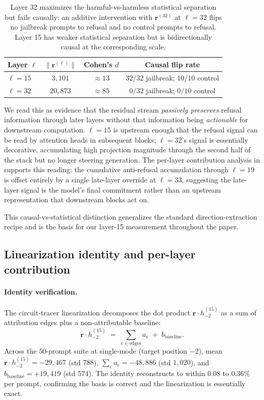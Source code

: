 \documentclass{article}
\newcommand{\rvec}{\bm{r}}
\newcommand{\norm}[1]{\lVert #1 \rVert}
\begin{document}
\begin{table}[h]
\centering
\small
\begin{tabular}{lccc}
\toprule
Layer $\ell$ & $\norm{\rvec^{(\ell)}}$ & Cohen's $d$ & Causal flip rate \\
\midrule
$\ell = 15$ & $3{,}101$  & $\approx 13$ & $32/32$ jailbreak; $10/10$ control \\
\midrule
$\ell = 32$ & $20{,}873$ & $\approx 85$ & $0/32$ jailbreak; $0/10$ control \\
\bottomrule
\end{tabular}
\caption{Layer 32 maximizes the harmful-vs-harmless statistical
separation but fails causally: an additive intervention with
$\rvec^{(32)}$ at $\ell = 32$ flips no jailbreak prompts to refusal
and no control prompts to refusal. Layer 15 has weaker statistical
separation but is bidirectionally causal at the corresponding scale.}
\label{tab:layer-selection}
\end{table}

We read this as evidence that the residual stream \emph{passively
preserves} refusal information through later layers without that
information being \emph{actionable} for downstream computation.
$\ell = 15$ is upstream enough that the refusal signal can be read
by attention heads in subsequent blocks; $\ell = 32$'s signal is
essentially decorative, accumulating high projection magnitude
through the second half of the stack but no longer steering
generation. The per-layer contribution analysis in
 supports this reading: the cumulative
anti-refusal accumulation through $\ell = 19$ is offset entirely by
a single late-layer override at $\ell = 33$, suggesting the
late-layer signal is the model's final commitment rather than an
upstream representation that downstream blocks act on.

This causal-vs-statistical distinction generalizes the standard
direction-extraction recipe and is the basis for our layer-15
measurement throughout the paper.

\subsection{Linearization identity and per-layer contribution}
\label{app:linearization}

\paragraph{Identity verification.} The circuit-tracer linearization
\citep{lindsey2025biology} decomposes the dot product
$\rvec \cdot h_{-2}^{(15)}$ as a sum of attribution edges plus a
non-attributable baseline:
\[
\rvec \cdot h_{-2}^{(15)} \;=\; \sum_{e \in \mathrm{edges}} a_e \;+\; b_{\mathrm{baseline}}.
\]
Across the $50$-prompt suite at single-mode (target position $-2$),
mean $\rvec \cdot h_{-2}^{(15)} = -29{,}467$ (std $788$),
$\sum_e a_e = -48{,}886$ (std $1{,}020$), and
$b_{\mathrm{baseline}} = +19{,}419$ (std $574$). The identity
reconstructs to within $0.08$ to $0.36\%$ per prompt, confirming the
basis is correct and the linearization is essentially exact.
\end{document}
